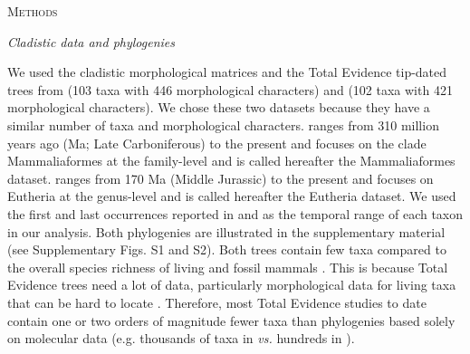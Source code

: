 \documentclass[12pt,letterpaper]{article}
\renewcommand{\section}[1]{%
\bigskip
\begin{center}
\begin{Large}
\normalfont\scshape #1
\medskip
\end{Large}
\end{center}}
\renewcommand{\subsection}[1]{%
\bigskip
\begin{center}
\begin{large}
\normalfont\itshape #1
\end{large}
\end{center}}
\begin{document}
%
%

\section{Methods}

\subsection{Cladistic data and phylogenies}
We used the cladistic morphological matrices and the Total Evidence tip-dated trees \cite{ronquista2012} from \cite{Slater2012MEE} (103 taxa with 446 morphological characters) and \cite{beckancient2014} (102 taxa with 421 morphological characters).
We chose these two datasets because they have a similar number of taxa and morphological characters.
\cite{Slater2012MEE} ranges from 310 million years ago (Ma; Late Carboniferous) to the present and focuses on the clade Mammaliaformes at the family-level and is called hereafter the Mammaliaformes dataset.
\cite{beckancient2014} ranges from 170 Ma (Middle Jurassic) to the present and focuses on Eutheria at the genus-level and is called hereafter the Eutheria dataset.
We used the first and last occurrences reported in \cite{Slater2012MEE} and \cite{beckancient2014} as the temporal range of each taxon in our analysis.
Both phylogenies are illustrated in the supplementary material (see Supplementary Figs. S1 and S2).
Both trees contain few taxa compared to the overall species richness of living and fossil mammals \cite{bininda2007delayed,archibald2011extinction}.
This is because Total Evidence trees need a lot of data, particularly morphological data for living taxa that can be hard to locate \cite{GuillermeCooper}.
Therefore, most Total Evidence studies to date contain one or two orders of magnitude fewer taxa than phylogenies based solely on molecular data (e.g. thousands of taxa in \cite{bininda2007delayed,meredithimpacts2011} \textit{vs.} hundreds in \cite{ronquista2012,Slater2012MEE,beckancient2014}).
\end{document}
